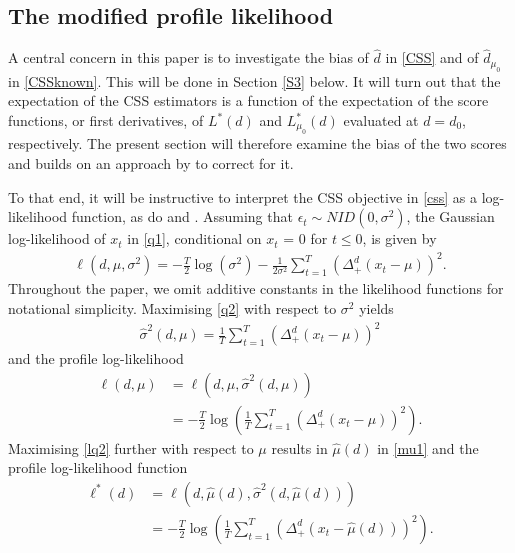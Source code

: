 {{\subsection{The modified profile likelihood} \label{sectionmod}

A central concern in this paper is to investigate the bias of $\hat{d}$ in \eqref{CSS} and of $\hat{d}_{\mu_0}$ in \eqref{CSSknown}. This will be done in Section \ref{S3} below. It will turn out that the expectation of the CSS estimators is a function of the expectation of the score functions, or first derivatives, of $L^*(d)$ and $L_{\mu_0}^*(d)$ evaluated at $d = d_0$, respectively. The present section will therefore examine the bias of the two scores
and builds on an approach by \textcite{mccullagh1990simple} to correct for it.

To that end, it will be instructive to interpret the CSS objective in \eqref{css} as a log-likelihood function, as do  \textcite{johansen2016role} and \textcite{hualde2020truncated}. Assuming that
$\epsilon_t \sim \textit{NID}(0,\sigma^2)$, the Gaussian log-likelihood of $x_t$ in \eqref{q1}, conditional on $x_t$ = $0$ for $t\leq 0$, is given by
\begin{align}
    \ell (d,\mu,\sigma^2) = -\frac{T}{2} \log\left(\sigma^2\right) - \frac{1}{2\sigma^2} \sum_{t = 1}^T \left(  \Delta_{+}^{d} (x_t-\mu ) \right)^2. \label{q2}
\end{align}
Throughout the paper, we omit additive constants in the likelihood functions for notational simplicity. 
Maximising \eqref{q2} with respect to $\sigma^2$ yields 
\begin{align*}
    \hat{\sigma}^2(d,\mu) = \frac{1}{T} \sum_{t = 1}^T \left(  \Delta_{+}^{d} (x_t-\mu ) \right)^2
\end{align*}
and the profile log-likelihood 
\begin{align}
     \ell(d,\mu) &= \ell (d,\mu,\hat{\sigma}^2(d,\mu)) \nonumber \\
     &= -\frac{T}{2} \log\left( \frac{1}{T} \sum_{t = 1}^T \left(  \Delta_{+}^{d} (x_t-\mu ) \right)^2\right). \label{lq2}
\end{align}  
Maximising \eqref{lq2} further with respect to $\mu$ results in $\hat \mu (d)$ in \eqref{mu1} and the  profile log-likelihood function
\begin{align}
    \ell^*(d) &= \ell (d,\hat{\mu}(d) ,\hat{\sigma}^2(d,\hat{\mu}(d)))  \nonumber \\
    &= -\frac{T}{2} \log\left( \frac{1}{T} \sum_{t = 1}^T \left(  \Delta_{+}^{d} (x_t-\hat{\mu}(d) ) \right)^2\right).  \label{lq3}

\end{align}}}
